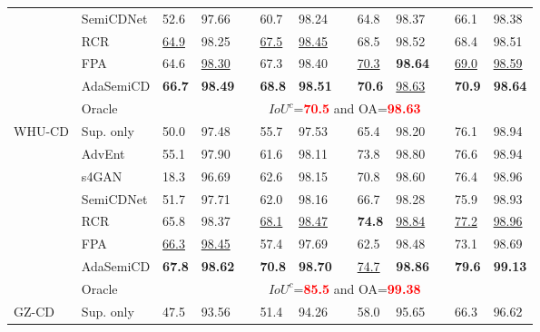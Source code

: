 \documentclass[lang=chs, degree=master, blindreview=false, adobe=false]{yanputhesis}
\begin{document}
\begin{table}[!htbp]
{\begin{tabular}{p{20mm}p{25mm}p{8mm}p{8mm}cp{8mm}p{8mm}cp{8mm}p{8mm}cp{8mm}p{8mm}}
      & SemiCDNet\cite{peng2021SemiCDNet} & 52.6 & 97.66 && 60.7 & 98.24 && 64.8 & 98.37 && 66.1 & 98.38 \\ %
      & RCR\cite{bandara2022RCR}& \underline{64.9} & 98.25 && \underline{67.5} & \underline{98.45} && 68.5 & 98.52 && 68.4 & 98.51 \\
      & FPA\cite{Zhang2023FPA}& 64.6 & \underline{98.30} && 67.3 & 98.40 && \underline{70.3} & \cellcolor{mycyan}\textbf{98.64} && \underline{69.0} & \underline{98.59} \\
      \rowcolor{mycyan}
      \multirow{-8}{*}{\cellcolor{white}}& \cellcolor{white}AdaSemiCD   &   \textbf{66.7} & \textbf{98.49} && \textbf{68.8} & \textbf{98.51} && \textbf{70.6} & \cellcolor{white}\underline{98.63} && \textbf{70.9} & \textbf{98.64} \\%
      \cline{2-13}
      & Oracle & \multicolumn{11}{c}{$ IoU^c$=\textcolor{red}{\bf 70.5} and OA=\textcolor{red}{\bf 98.63}} \\
      \bottomrule
      \multirow{8}{*}{WHU-CD}
      & Sup. only   &   50.0 & 97.48 && 55.7 & 97.53 && 65.4 & 98.20 && 76.1 & 98.94 \\ %
      & AdvEnt\cite{vu2019advent}& 55.1 & 97.90 && 61.6 & 98.11 && 73.8 & 98.80 && 76.6 & 98.94 \\ %
      & s4GAN\cite{mittal2019semi}& 18.3 & 96.69 && 62.6 & 98.15 && 70.8 & 98.60 && 76.4 & 98.96 \\
      & SemiCDNet\cite{peng2021SemiCDNet} & 51.7 & 97.71 && 62.0 & 98.16 && 66.7 & 98.28 && 75.9 & 98.93 \\ %
      & RCR\cite{bandara2022RCR}& 65.8 & 98.37 && \underline{68.1} & \underline{98.47} && \cellcolor{mycyan}\textbf{74.8} & \underline{98.84} && \underline{77.2} & \underline{98.96} \\
      & FPA\cite{Zhang2023FPA}& \underline{66.3} & \underline{98.45} && 57.4 & 97.69 && 62.5 & 98.48 && 73.1 & 98.69 \\
      \rowcolor{mycyan}
      \multirow{-8}{*}{\cellcolor{white}}& \cellcolor{white}AdaSemiCD   &   \textbf{67.8} & \textbf{98.62} && \textbf{70.8} & \textbf{98.70} && \cellcolor{white}\underline{74.7} & \textbf{98.86} && \textbf{79.6} & \textbf{99.13} \\%
      \cline{2-13}
      & Oracle & \multicolumn{11}{c}{$ IoU^c$=\textcolor{red}{\bf 85.5} and OA=\textcolor{red}{\bf 99.38}} \\
      \bottomrule
      \multirow{8}{*}{GZ-CD}
      & Sup. only   &   47.5 & 93.56 && 51.4 & 94.26 && 58.0 & 95.65 && 66.3 & 96.62 \\ %

\end{tabular}}
\end{table}
\end{document}
